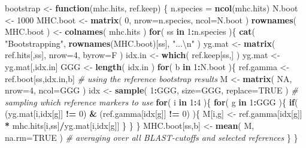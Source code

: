 \documentclass[]{article}
\newenvironment{Shaded}{\begin{snugshade}}{\end{snugshade}}
\newcommand{\KeywordTok}[1]{\textcolor[rgb]{0.13,0.29,0.53}{\textbf{#1}}}
\newcommand{\DataTypeTok}[1]{\textcolor[rgb]{0.13,0.29,0.53}{#1}}
\newcommand{\DecValTok}[1]{\textcolor[rgb]{0.00,0.00,0.81}{#1}}
\newcommand{\CharTok}[1]{\textcolor[rgb]{0.31,0.60,0.02}{#1}}
\newcommand{\StringTok}[1]{\textcolor[rgb]{0.31,0.60,0.02}{#1}}
\newcommand{\CommentTok}[1]{\textcolor[rgb]{0.56,0.35,0.01}{\textit{#1}}}
\newcommand{\OtherTok}[1]{\textcolor[rgb]{0.56,0.35,0.01}{#1}}
\newcommand{\ControlFlowTok}[1]{\textcolor[rgb]{0.13,0.29,0.53}{\textbf{#1}}}
\newcommand{\OperatorTok}[1]{\textcolor[rgb]{0.81,0.36,0.00}{\textbf{#1}}}
\newcommand{\NormalTok}[1]{#1}
\begin{document}
\begin{Shaded}
\begin{Highlighting}[]
\NormalTok{bootstrap <-}\StringTok{ }\ControlFlowTok{function}\NormalTok{(mhc.hits, ref.keep) \{}
\NormalTok{  n.species =}\StringTok{ }\KeywordTok{ncol}\NormalTok{(mhc.hits)}
\NormalTok{  N.boot <-}\StringTok{ }\DecValTok{1000}
\NormalTok{  MHC.boot <-}\StringTok{ }\KeywordTok{matrix}\NormalTok{( }\DecValTok{0}\NormalTok{, }\DataTypeTok{nrow=}\NormalTok{n.species, }\DataTypeTok{ncol=}\NormalTok{N.boot )}
  \KeywordTok{rownames}\NormalTok{( MHC.boot ) <-}\StringTok{ }\KeywordTok{colnames}\NormalTok{( mhc.hits )}
  \ControlFlowTok{for}\NormalTok{( ss }\ControlFlowTok{in} \DecValTok{1}\OperatorTok{:}\NormalTok{n.species )\{}
    \KeywordTok{cat}\NormalTok{( }\StringTok{"Bootstrapping"}\NormalTok{, }\KeywordTok{rownames}\NormalTok{(MHC.boot)[ss], }\StringTok{"...}\CharTok{\textbackslash{}n}\StringTok{"}\NormalTok{ )}
\NormalTok{    yg.mat <-}\StringTok{ }\KeywordTok{matrix}\NormalTok{( ref.hits[,ss], }\DataTypeTok{nrow=}\DecValTok{4}\NormalTok{, }\DataTypeTok{byrow=}\NormalTok{F )}
\NormalTok{    idx.in <-}\StringTok{ }\KeywordTok{which}\NormalTok{( ref.keep[ss,] )}
\NormalTok{    yg.mat <-}\StringTok{ }\NormalTok{yg.mat[,idx.in]}
\NormalTok{    GGG <-}\StringTok{ }\KeywordTok{length}\NormalTok{( idx.in )}
    \ControlFlowTok{for}\NormalTok{( b }\ControlFlowTok{in} \DecValTok{1}\OperatorTok{:}\NormalTok{N.boot )\{}
\NormalTok{      ref.gamma <-}\StringTok{ }\NormalTok{ref.boot[ss,idx.in,b]               }\CommentTok{# using the reference bootstrap results}
\NormalTok{      M <-}\StringTok{ }\KeywordTok{matrix}\NormalTok{( }\OtherTok{NA}\NormalTok{, }\DataTypeTok{nrow=}\DecValTok{4}\NormalTok{, }\DataTypeTok{ncol=}\NormalTok{GGG )}
\NormalTok{      idx <-}\StringTok{ }\KeywordTok{sample}\NormalTok{( }\DecValTok{1}\OperatorTok{:}\NormalTok{GGG, }\DataTypeTok{size=}\NormalTok{GGG, }\DataTypeTok{replace=}\OtherTok{TRUE}\NormalTok{ )   }\CommentTok{# sampling which reference markers to use}
      \ControlFlowTok{for}\NormalTok{( i }\ControlFlowTok{in} \DecValTok{1}\OperatorTok{:}\DecValTok{4}\NormalTok{ )\{}
        \ControlFlowTok{for}\NormalTok{( g }\ControlFlowTok{in} \DecValTok{1}\OperatorTok{:}\NormalTok{GGG )\{}
          \ControlFlowTok{if}\NormalTok{( (yg.mat[i,idx[g]] }\OperatorTok{!=}\StringTok{ }\DecValTok{0}\NormalTok{) }\OperatorTok{&}\StringTok{ }\NormalTok{(ref.gamma[idx[g]] }\OperatorTok{!=}\StringTok{ }\DecValTok{0}\NormalTok{) )\{}
\NormalTok{            M[i,g] <-}\StringTok{ }\NormalTok{ref.gamma[idx[g]] }\OperatorTok{*}\StringTok{ }\NormalTok{mhc.hits[i,ss]}\OperatorTok{/}\NormalTok{yg.mat[i,idx[g]] }
\NormalTok{          \}}
\NormalTok{        \}}
\NormalTok{      \}}
\NormalTok{      MHC.boot[ss,b] <-}\StringTok{ }\KeywordTok{mean}\NormalTok{( M, }\DataTypeTok{na.rm=}\OtherTok{TRUE}\NormalTok{ ) }\CommentTok{# averaging over all BLAST-cutoffs and selected references}
\NormalTok{    \}}
\NormalTok{  \}}
  

\end{Highlighting}
\end{Shaded}
\end{document}
